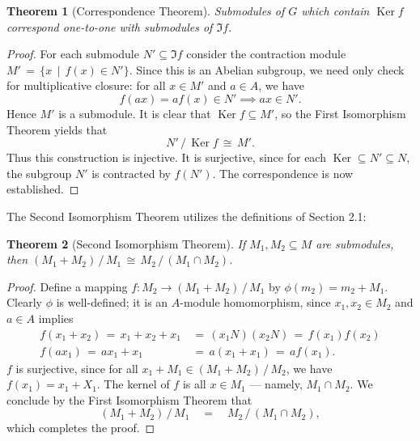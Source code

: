 \documentclass[11pt]{article}
\newtheorem{theorem}{Theorem}
\newcommand{\Ker}{\operatorname{Ker}}
\begin{document}
\begin{adjustwidth}{0.5cm}{}
  \begin{theorem}[Correspondence Theorem]
    Submodules of $G$ which contain $\Ker f$ correspond one-to-one with submodules of $\Im f$.
  \end{theorem}
  \begin{proof}
    For each submodule $N' \subseteq \Im f$ consider the contraction module $M' \, = \, \{ x \, \mid \, f(x) \in N' \}$. Since this is an Abelian subgroup, we need only check for multiplicative closure: for all $x \in M'$ and $a \in A$, we have
    \[
      f(ax) = a f(x) \in N' \implies ax \in N'.
    \]
    Hence $M'$ is a submodule. It is clear that $\Ker f \subseteq M'$, so the First Isomorphism Theorem yields that
    \[
      N' \, / \, \Ker f \, \cong \, M'.
    \]
    Thus this construction is injective. It is surjective, since for each $\Ker \subseteq N' \subseteq N$, the subgroup $N'$ is contracted by $f(N')$. The correspondence is now established.
  \end{proof}
\end{adjustwidth}

The Second Isomorphism Theorem utilizes the definitions of Section 2.1:

\begin{adjustwidth}{0.5cm}{}
  \begin{theorem}[Second Isomorphism Theorem]
    If $M_{1}, M_{2} \subseteq M$ are submodules, then $(M_{1} + M_{2}) \, / \, M_{1} \, \cong \, M_{2} \, / \, (M_{1} \cap M_{2})$.
  \end{theorem}
  \begin{proof}
    Define a mapping $f : M_{2} \to (M_{1} + M_{2}) \, / \, M_{1}$ by $\phi(m_{2}) = m_{2} + M_{1}$. Clearly $\phi$ is well-defined; it is an $A$-module homomorphism, since $x_{1}, x_{2} \in M_{2}$ and $a \in A$ implies
    \begin{align*}
      f(x_{1} + x_{2}) \, = \, x_{1} + x_{2} + x_{1} \, &= \, (x_{1}N)(x_{2}N) \, = \, f(x_{1}) f(x_{2}) \\
                    f(ax_{1}) \, = \, ax_{1} + x_{1} \, &= \, a(x_{1} + x_{1}) \, = \, a f(x_{1}).
    \end{align*}
    $f$ is surjective, since for all $x_{1} + M_{1} \in (M_{1} + M_{2}) \, / \, M_{2}$, we have $f(x_{1}) = x_{1} + X_{1}$. The kernel of $f$ is all $x \in M_{1}$ --- namely, $M_{1} \cap M_{2}$. We conclude by the First Isomorphism Theorem that
    \[
      (M_{1} + M_{2}) \, / \, M_{1} \quad = \quad M_{2} \, / \, (M_{1} \cap M_{2}),
    \]
    which completes the proof.
  \end{proof}
\end{adjustwidth}
\end{document}
